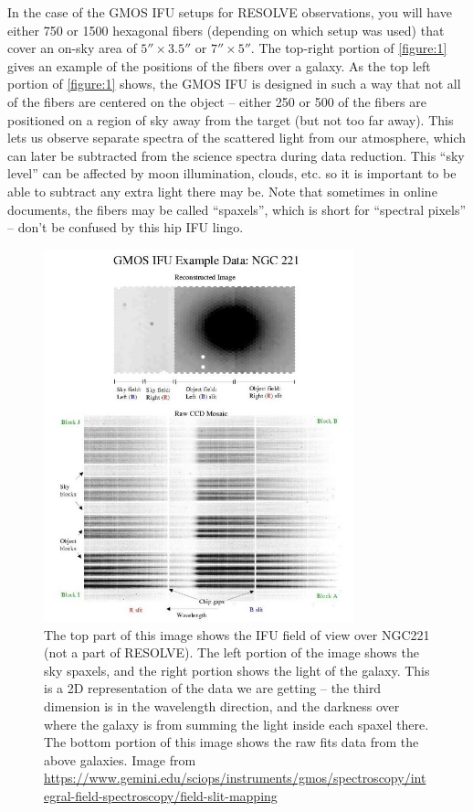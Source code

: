 \documentclass[12pt]{report}
\begin{document}
In the case of the GMOS IFU setups for RESOLVE observations, you will have either 750 or 1500 hexagonal fibers (depending on which setup was used) that cover an on-sky area of $5''\times3.5''$ or $7''\times5''$. The top-right portion of \autoref{figure:1} gives an example of the positions of the fibers over a galaxy. As the top left portion of \autoref{figure:1} shows, the GMOS IFU is designed in such a way that not all of the fibers are centered on the object -- either 250 or 500 of the fibers are positioned on a region of sky away from the target (but not too far away). This lets us observe separate spectra of the scattered light from our atmosphere, which can later be subtracted from the science spectra during data reduction. This ``sky level'' can be affected by moon illumination, clouds, etc. so it is important to be able to subtract any extra light there may be. Note that sometimes in online documents, the fibers may be called ``spaxels'', which is short for ``spectral pixels'' -- don't be confused by this hip IFU lingo.

\begin{figure}[h]
\centering
\includegraphics[width=0.8\textwidth]{fiber_examples.jpeg}
\caption[IFU Fibers and Data Format]{The top part of this image shows the IFU field of view over NGC221 (not a part of RESOLVE). The left portion of the image shows the sky spaxels, and the right portion shows the light of the galaxy. This is a 2D representation of the data we are getting -- the third dimension is in the wavelength direction, and the darkness over where the galaxy is from summing the light inside each spaxel there. The bottom portion of this image shows the raw fits data from the above galaxies.  \footnotesize{Image from \url{https://www.gemini.edu/sciops/instruments/gmos/spectroscopy/integral-field-spectroscopy/field-slit-mapping}}}
\label{figure:1}
\end{figure}
\end{document}
